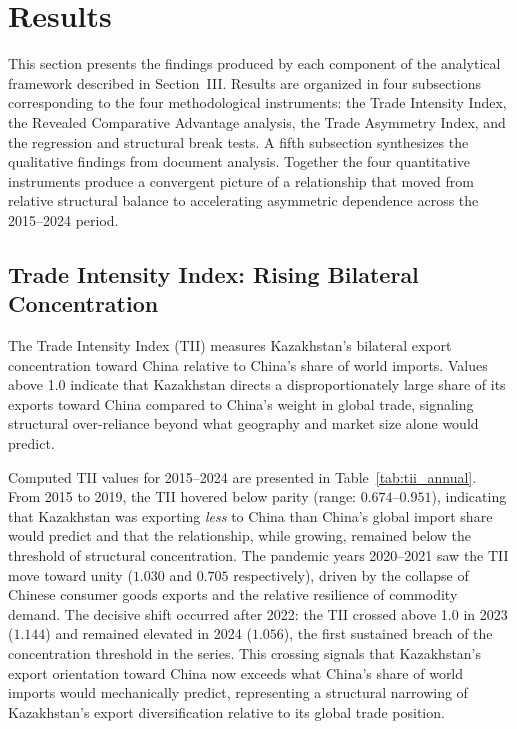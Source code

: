 \documentclass[12pt]{article}
\begin{document}
\section{Results}

This section presents the findings produced by each component of the analytical framework described in Section~III. Results are organized in four subsections corresponding to the four methodological instruments: the Trade Intensity Index, the Revealed Comparative Advantage analysis, the Trade Asymmetry Index, and the regression and structural break tests. A fifth subsection synthesizes the qualitative findings from document analysis. Together the four quantitative instruments produce a convergent picture of a relationship that moved from relative structural balance to accelerating asymmetric dependence across the 2015--2024 period.

\subsection{Trade Intensity Index: Rising Bilateral Concentration}

The Trade Intensity Index (TII) measures Kazakhstan's bilateral export concentration toward China relative to China's share of world imports. Values above 1.0 indicate that Kazakhstan directs a disproportionately large share of its exports toward China compared to China's weight in global trade, signaling structural over-reliance beyond what geography and market size alone would predict.

Computed TII values for 2015--2024 are presented in Table~\ref{tab:tii_annual}. From 2015 to 2019, the TII hovered below parity (range: $0.674$--$0.951$), indicating that Kazakhstan was exporting \textit{less} to China than China's global import share would predict and that the relationship, while growing, remained below the threshold of structural concentration. The pandemic years 2020--2021 saw the TII move toward unity ($1.030$ and $0.705$ respectively), driven by the collapse of Chinese consumer goods exports and the relative resilience of commodity demand. The decisive shift occurred after 2022: the TII crossed above 1.0 in 2023 ($1.144$) and remained elevated in 2024 ($1.056$), the first sustained breach of the concentration threshold in the series. This crossing signals that Kazakhstan's export orientation toward China now exceeds what China's share of world imports would mechanically predict, representing a structural narrowing of Kazakhstan's export diversification relative to its global trade position.
\end{document}
